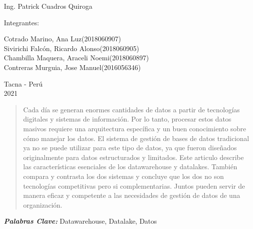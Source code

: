 \documentclass{article}
\providecommand{\pclave}[1]{
  \small	
  \textbf{\textit{\quad \quad Palabras Clave: }} #1}
\begin{document}
\begin{titlepage}
\begin{center}
\vspace*{0.1in}
\begin{large}
 Ing. Patrick Cuadros Quiroga\\
\end{large}

\vspace*{0.2in}
\vspace*{0.1in}
\begin{large}

Integrantes: \\
\begin{flushleft}
Cotrado Marino, Ana Luz\hfill(2018060907)\\
Sivirichi Falcón, Ricardo Alonso\hfill(2018060905) \\
Chambilla Maquera, Araceli Noemi\hfill(2018060897)\\
Contreras Murguia, Jose Manuel\hfill (2016056346)\\

\end{flushleft}
\end{large}

\vspace*{0.1in}
\begin{large}
Tacna - Perú\\
2021
\end{large}
\end{center}
\end{titlepage}


\begin{abstract}
\quad 
Cada día se generan enormes cantidades de datos a partir de tecnologías digitales y sistemas de información. Por lo tanto, procesar estos datos masivos requiere una arquitectura específica y un buen conocimiento sobre cómo manejar los datos. El sistema de gestión de bases de datos tradicional ya no se puede utilizar para este tipo de datos, ya que fueron diseñados originalmente para datos estructurados y limitados. Este articulo describe las características esenciales de los datawarehouse y datalakes. También compara y contrasta los dos sistemas y concluye que los dos no son tecnologías competitivas pero si complementarias. Juntos pueden servir de manera eficaz y competente a las necesidades de gestión de datos de una organización.

\end{abstract}
\pclave{Datawarehouse, Datalake, Datos}
\end{document}

